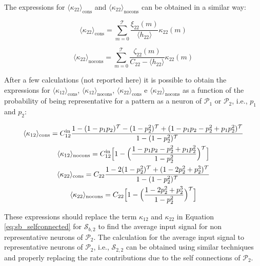 \documentclass[a4paper, 12pt, twoside, openright]{book}
\newcommand{\popI}{\mathcal{P}_1}
\newcommand{\popII}{\mathcal{P}_2}
\newcommand{\T}{\mathcal{T}}
\begin{document}
The expressions for
$\langle \kappa_{22} \rangle_{\text{cons}}$ and $\langle \kappa_{22} \rangle_{\text{nocons}}$ can be obtained in a similar way:

\begin{equation}
    \langle \kappa_{22} \rangle_{\text{cons}} = 
    \sum_{m=0}^{\T} \frac{\xi_{22}(m)}{\langle h_{22} \rangle}
    \kappa_{22}(m)
\end{equation}

\begin{equation}
    \langle \kappa_{22} \rangle_{\text{nocons}} =   \sum_{m=0}^{\T} \frac{\zeta_{22}(m)}{C_{22} -\langle h_{22} \rangle}
    \kappa_{22}(m)
\end{equation}

After a few calculations (not reported here) it is possible to obtain the expressions for
$\langle \kappa_{12} \rangle_{\text{cons}}$,
$\langle \kappa_{12} \rangle_{\text{nocons}}$,
$\langle \kappa_{22} \rangle_{\text{cons}}$ e
$\langle \kappa_{22} \rangle_{\text{nocons}}$
as a function of the probability of being representative for a pattern as a neuron of $\popI$ or $\popII$, i.e., $p_1$ and $p_2$:

\begin{equation}
\begin{gathered}
    \langle \kappa_{12} \rangle_{\text{cons}}= C_{12}^\text{in} \frac{
    1 - (1-p_{1} p_{2})^\T
    -(1-p_{2}^2)^\T
    +(1 - p_{1} p_{2} - p_{2}^2
    + p_{1} p_{2}^{2})^\T}
    {1-(1-p_{2}^2)^\T} \\
    \langle \kappa_{12} \rangle_{\text{nocons}}= C_{12}^\text{in} \Bigl[1-\Bigl(\frac
    {1- p_{1} p_{2} - p_{2}^2 + p_{1} p_{2}^{2}}{1-p_{2}^2} \Bigr)^\T \Bigr] \\
    \langle \kappa_{22} \rangle_{\text{cons}}= C_{22} \frac{1-2(1-p_{2}^2)^\T+(1-2p_{2}^2+p_{2}^{3})^\T}{1-(1-p_{2}^2)^\T} \\
    \langle \kappa_{22} \rangle_{\text{nocons}}= C_{22} \Bigl[1-\Bigl(\frac{1-2p_{2}^2+p_{2}^{3}}{1-p_{2}^2} \Bigr)^\T \Bigr]
\end{gathered}
\end{equation}

These expressions should replace the term $\kappa_{12}$ and $\kappa_{22}$ in Equation \eqref{eq:sb_selfconnected} for $\mathcal{S}_{b,2}$ to find the average input signal for non representative neurons of $\popII$. The calculation for the average input signal to representative neurons of $\popII$, i.e., $\mathcal{S}_{2,2}$ can be obtained using similar techniques and properly replacing the rate contributions due to the self connections of $\popII$.
\end{document}
